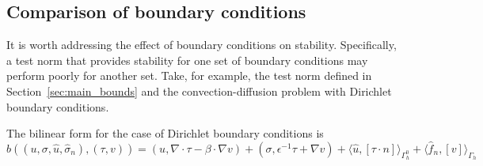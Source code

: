 \documentclass[11pt,onecolumn]{scrartcl}
\newcommand{\grad}{\nabla}
\renewcommand{\div}{\grad \cdot}
\begin{document}
\subsection{Comparison of boundary conditions}

It is worth addressing the effect of boundary conditions on stability.  Specifically, a test norm that provides stability for one set of boundary conditions may perform poorly for another set.  Take, for example, the test norm defined in Section~\ref{sec:main_bounds} and the convection-diffusion problem with Dirichlet boundary conditions. 

The bilinear form for the case of Dirichlet boundary conditions is 
\[
b\left(\left(u,\sigma, \widehat{u}, \widehat{\sigma}_n\right), \left(\tau, v\right)\right) = \left(u,\div \tau - \beta \cdot \grad v\right) + \left(\sigma, \epsilon^{-1} \tau + \grad v\right) + \langle \widehat{u}, \left[\tau \cdot n\right] \rangle_{\Gamma_h^0} + \langle \widehat{f}_n, \left[v\right] \rangle_{\Gamma_h}
\]
\end{document}
